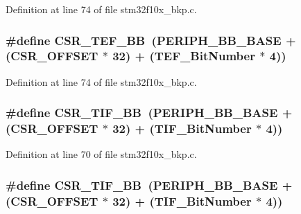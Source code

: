 Definition at line 74 of file stm32f10x\+\_\+bkp.\+c.

\subsubsection[{\texorpdfstring{C\+S\+R\+\_\+\+T\+E\+F\+\_\+\+BB}{CSR_TEF_BB}}]{\setlength{\rightskip}{0pt plus 5cm}\#define C\+S\+R\+\_\+\+T\+E\+F\+\_\+\+BB~({\bf P\+E\+R\+I\+P\+H\+\_\+\+B\+B\+\_\+\+B\+A\+SE} + ({\bf C\+S\+R\+\_\+\+O\+F\+F\+S\+ET} $\ast$ 32) + ({\bf T\+E\+F\+\_\+\+Bit\+Number} $\ast$ 4))}\hypertarget{group___b_k_p___private___defines_gad60539cc791a26701d414aee529ea203}{}\label{group___b_k_p___private___defines_gad60539cc791a26701d414aee529ea203}


Definition at line 74 of file stm32f10x\+\_\+bkp.\+c.

\subsubsection[{\texorpdfstring{C\+S\+R\+\_\+\+T\+I\+F\+\_\+\+BB}{CSR_TIF_BB}}]{\setlength{\rightskip}{0pt plus 5cm}\#define C\+S\+R\+\_\+\+T\+I\+F\+\_\+\+BB~({\bf P\+E\+R\+I\+P\+H\+\_\+\+B\+B\+\_\+\+B\+A\+SE} + ({\bf C\+S\+R\+\_\+\+O\+F\+F\+S\+ET} $\ast$ 32) + ({\bf T\+I\+F\+\_\+\+Bit\+Number} $\ast$ 4))}\hypertarget{group___b_k_p___private___defines_ga8d9e7cac2321fae6d257e8c1316264e3}{}\label{group___b_k_p___private___defines_ga8d9e7cac2321fae6d257e8c1316264e3}


Definition at line 70 of file stm32f10x\+\_\+bkp.\+c.

\subsubsection[{\texorpdfstring{C\+S\+R\+\_\+\+T\+I\+F\+\_\+\+BB}{CSR_TIF_BB}}]{\setlength{\rightskip}{0pt plus 5cm}\#define C\+S\+R\+\_\+\+T\+I\+F\+\_\+\+BB~({\bf P\+E\+R\+I\+P\+H\+\_\+\+B\+B\+\_\+\+B\+A\+SE} + ({\bf C\+S\+R\+\_\+\+O\+F\+F\+S\+ET} $\ast$ 32) + ({\bf T\+I\+F\+\_\+\+Bit\+Number} $\ast$ 4))}\hypertarget{group___b_k_p___private___defines_ga8d9e7cac2321fae6d257e8c1316264e3}{}\label{group___b_k_p___private___defines_ga8d9e7cac2321fae6d257e8c1316264e3}


